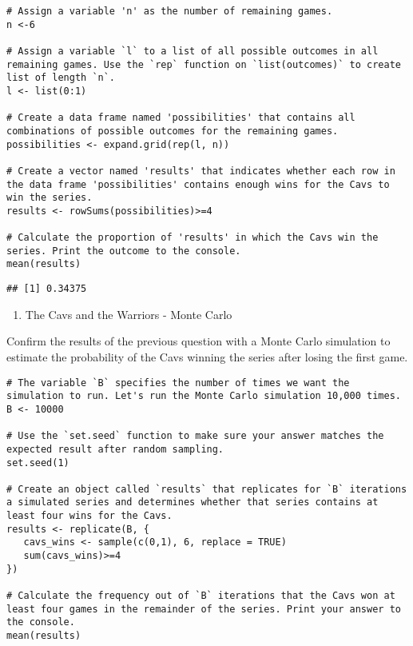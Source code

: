 \documentclass[
]{article}
\providecommand{\tightlist}{%
  \setlength{\itemsep}{0pt}\setlength{\parskip}{0pt}}
\begin{document}
\begin{verbatim}
# Assign a variable 'n' as the number of remaining games.
n <-6

# Assign a variable `l` to a list of all possible outcomes in all remaining games. Use the `rep` function on `list(outcomes)` to create list of length `n`.
l <- list(0:1)

# Create a data frame named 'possibilities' that contains all combinations of possible outcomes for the remaining games.
possibilities <- expand.grid(rep(l, n))

# Create a vector named 'results' that indicates whether each row in the data frame 'possibilities' contains enough wins for the Cavs to win the series.
results <- rowSums(possibilities)>=4

# Calculate the proportion of 'results' in which the Cavs win the series. Print the outcome to the console.
mean(results)
\end{verbatim}

\begin{verbatim}
## [1] 0.34375
\end{verbatim}

\begin{enumerate}
\def\labelenumi{\arabic{enumi}.}
\setcounter{enumi}{2}
\tightlist
\item
  The Cavs and the Warriors - Monte Carlo
\end{enumerate}

Confirm the results of the previous question with a Monte Carlo
simulation to estimate the probability of the Cavs winning the series
after losing the first game.

\begin{verbatim}
# The variable `B` specifies the number of times we want the simulation to run. Let's run the Monte Carlo simulation 10,000 times.
B <- 10000

# Use the `set.seed` function to make sure your answer matches the expected result after random sampling.
set.seed(1)

# Create an object called `results` that replicates for `B` iterations a simulated series and determines whether that series contains at least four wins for the Cavs.
results <- replicate(B, {
   cavs_wins <- sample(c(0,1), 6, replace = TRUE)
   sum(cavs_wins)>=4
})

# Calculate the frequency out of `B` iterations that the Cavs won at least four games in the remainder of the series. Print your answer to the console.
mean(results)
\end{verbatim}
\end{document}
